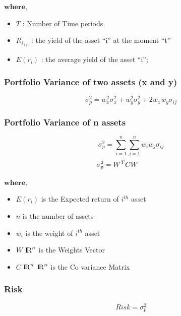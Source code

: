\documentclass[conference]{IEEEtran}
\begin{document}
        $ \textbf{where,} $
        \begin{itemize}
            \item $ T $ : Number of Time periods
            \item $ R_{i_{(t)}} $: the yield of the asset “i” at the moment “t”
            \item $ E(r_i) $ : the average yield of the asset “i”; 

        \end{itemize}
    
    \text{\n}
    
    \subsubsection{Portfolio Variance of two assets (x and y)}
        \[
            \sigma_p^2 = 
            w_x^2\sigma_x^2 + 
            w_y^2\sigma_y^2 + 
            2 w_x w_y \sigma_{ij}
        \]
        
    \subsubsection{Portfolio Variance of n assets}
        \[
            \sigma_p^2 = 
            \sum_{i=1}^{n}
            \sum_{j=1}^{n}
            w_i w_j \sigma_{ij}
        \]
        \text{\n}
        \[
            \sigma_p^2 = 
            W^T C W
            \hspace{1.35cm}
        \]
        
        $ \textbf{where,} $
        \begin{itemize}
            \item $E(r_i)$ is the Expected return of $i^{th}$ asset
            \item $n$ is the number of assets
            \item $w_i$ is the weight of $i^{th}$ asset
            \item $W$ \in \hspace{0.1cm} ${\rm I\!R}^n$ is the Weights Vector
            \item $C$ \in \hspace{0.1cm} ${\rm I\!R}^n$\times \hspace{0.1cm} ${\rm I\!R}^n$ is the Co variance Matrix
        \end{itemize}
    
    \text{\n}
    \subsubsection {Risk}
        \[
            Risk = \sigma_p^2 
        \]
    
\end{document}
